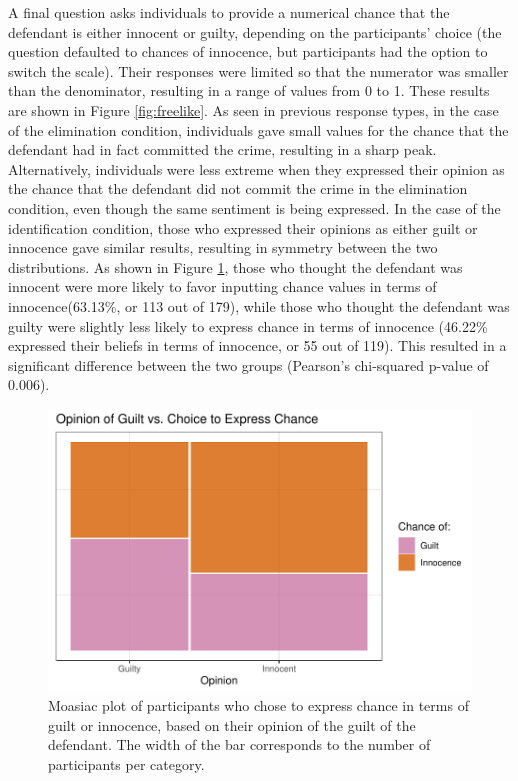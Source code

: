 \documentclass[print]{nuthesis}
\begin{document}
A final question asks individuals to provide a numerical chance that the defendant is either innocent or guilty, depending on the participants' choice (the question defaulted to chances of innocence, but participants had the option to switch the scale).
Their responses were limited so that the numerator was smaller than the denominator, resulting in a range of values from 0 to 1.
These results are shown in Figure \ref{fig:freelike}.
As seen in previous response types, in the case of the elimination condition, individuals gave small values for the chance that the defendant had in fact committed the crime, resulting in a sharp peak.
Alternatively, individuals were less extreme when they expressed their opinion as the chance that the defendant did not commit the crime in the elimination condition, even though the same sentiment is being expressed.
In the case of the identification condition, those who expressed their opinions as either guilt or innocence gave similar results, resulting in symmetry between the two distributions.
As shown in Figure \ref{fig:opinionchanceplot}, those who thought the defendant was innocent were more likely to favor inputting chance values in terms of innocence(63.13\%, or 113 out of 179), while those who thought the defendant was guilty were slightly less likely to express chance in terms of innocence (46.22\% expressed their beliefs in terms of innocence, or 55 out of 119).
This resulted in a significant difference between the two groups (Pearson's chi-squared p-value of 0.006).

\begin{figure}

{\centering \includegraphics[width=\linewidth]{thesis_files/figure-latex/opinionchanceplot-1} 

}

\caption[Moasiac plot of participants who chose to express chance in terms of guilt or innocence, based on their opinion of the guilt of the defendant.]{Moasiac plot of participants who chose to express chance in terms of guilt or innocence, based on their opinion of the guilt of the defendant. The width of the bar corresponds to the number of participants per category.}\label{fig:opinionchanceplot}
\end{figure}
\end{document}

